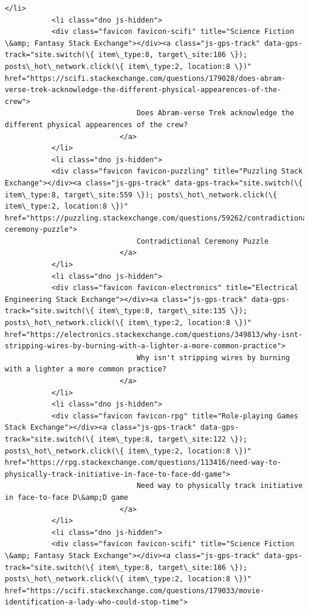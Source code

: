 \documentclass[11pt]{article}
\begin{document}
\begin{Verbatim}[commandchars=\\\{\}]
           </li>
           <li class="dno js-hidden">
           <div class="favicon favicon-scifi" title="Science Fiction \&amp; Fantasy Stack Exchange"></div><a class="js-gps-track" data-gps-track="site.switch(\{ item\_type:8, target\_site:186 \}); posts\_hot\_network.click(\{ item\_type:2, location:8 \})" href="https://scifi.stackexchange.com/questions/179028/does-abram-verse-trek-acknowledge-the-different-physical-appearences-of-the-crew">
                               Does Abram-verse Trek acknowledge the different physical appearences of the crew?
                           </a>
           </li>
           <li class="dno js-hidden">
           <div class="favicon favicon-puzzling" title="Puzzling Stack Exchange"></div><a class="js-gps-track" data-gps-track="site.switch(\{ item\_type:8, target\_site:559 \}); posts\_hot\_network.click(\{ item\_type:2, location:8 \})" href="https://puzzling.stackexchange.com/questions/59262/contradictional-ceremony-puzzle">
                               Contradictional Ceremony Puzzle
                           </a>
           </li>
           <li class="dno js-hidden">
           <div class="favicon favicon-electronics" title="Electrical Engineering Stack Exchange"></div><a class="js-gps-track" data-gps-track="site.switch(\{ item\_type:8, target\_site:135 \}); posts\_hot\_network.click(\{ item\_type:2, location:8 \})" href="https://electronics.stackexchange.com/questions/349813/why-isnt-stripping-wires-by-burning-with-a-lighter-a-more-common-practice">
                               Why isn't stripping wires by burning with a lighter a more common practice?
                           </a>
           </li>
           <li class="dno js-hidden">
           <div class="favicon favicon-rpg" title="Role-playing Games Stack Exchange"></div><a class="js-gps-track" data-gps-track="site.switch(\{ item\_type:8, target\_site:122 \}); posts\_hot\_network.click(\{ item\_type:2, location:8 \})" href="https://rpg.stackexchange.com/questions/113416/need-way-to-physically-track-initiative-in-face-to-face-dd-game">
                               Need way to physically track initiative in face-to-face D\&amp;D game
                           </a>
           </li>
           <li class="dno js-hidden">
           <div class="favicon favicon-scifi" title="Science Fiction \&amp; Fantasy Stack Exchange"></div><a class="js-gps-track" data-gps-track="site.switch(\{ item\_type:8, target\_site:186 \}); posts\_hot\_network.click(\{ item\_type:2, location:8 \})" href="https://scifi.stackexchange.com/questions/179033/movie-identification-a-lady-who-could-stop-time">

\end{Verbatim}
\end{document}
